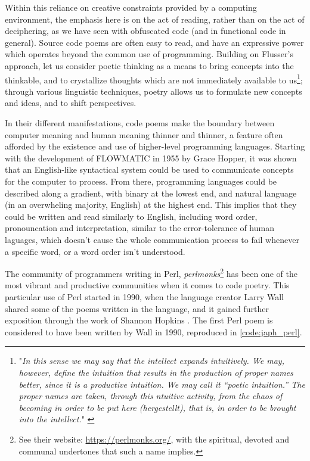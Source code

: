 Within this reliance on creative constraints provided by a computing environment, the emphasis here is on the act of reading, rather than on the act of deciphering, as we have seen with obfuscated code (and in functional code in general). Source code poems are often easy to read, and have an expressive power which operates beyond the common use of programming. Building on Flusser's approach, let us consider poetic thinking as a means to bring concepts into the thinkable, and to crystallize thoughts which are not immediately available to us\footnote{"\emph{In this sense we may say that the intellect expands intuitively. We may, however, define the intuition that results in the production of proper names better, since it is a productive intuition. We may call it “poetic intuition.” The proper names are taken, through this ntuitive activity, from the chaos of becoming in order to be put here (hergestellt), that is, in order to be brought into the intellect.}" \citep{flusser_doubt_2014}}; through various linguistic techniques, poetry allows us to formulate new concepts and ideas, and to shift perspectives.

In their different manifestations, code poems make the boundary between computer meaning and human meaning thinner and thinner, a feature often afforded by the existence and use of higher-level programming languages. Starting with the development of FLOWMATIC in 1955 by Grace Hopper, it was shown that an English-like syntactical system could be used to communicate concepts for the computer to process. From there, programming languages could be described along a gradient, with binary at the lowest end, and natural language (in an overwheling majority, English) at the highest end. This implies that they could be written and read similarly to English, including word order, pronouncation and interpretation, similar to the error-tolerance of human laguages, which doesn't cause the whole communication process to fail whenever a specific word, or a word order isn't understood.

The community of programmers writing in Perl, \emph{perlmonks}\footnote{See their website: \url{https://perlmonks.org/}, with the spiritual, devoted and communal undertones that such a name implies.} has been one of the most vibrant and productive communities when it comes to code poetry. This particular use of Perl started in 1990, when the language creator Larry Wall shared some of the poems written in the language, and it gained further exposition through the work of Shannon Hopkins \citep{hopkins_camels_1992}. The first Perl poem is considered to have been written by Wall in 1990, reproduced in \ref{code:japh_perl}.


